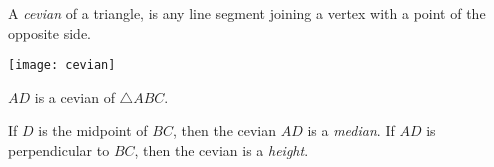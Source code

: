 \documentclass[12pt]{article}
\begin{document}
A \emph{cevian} of a triangle, is any line segment joining a vertex with a point of the opposite side.

\begin{center}\texttt{[image: cevian]}\end{center}
$AD$ is a cevian of $\triangle ABC$.

If $D$ is the midpoint of $BC$, then the cevian $AD$ is a \emph{median}.  If $AD$ is perpendicular to $BC$, then the cevian is a \emph{height}.
\end{document}
